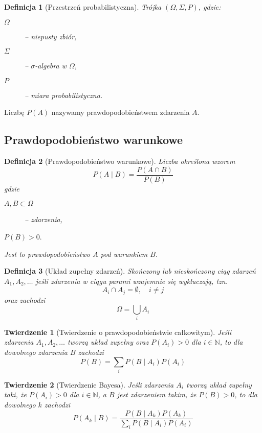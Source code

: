 \documentclass[11pt, leqno]{scrartcl}
\theoremstyle{mydefinition}
\newtheorem{definition}{Definicja}[subsection]
\theoremstyle{mytheorem}
\newtheorem{theorem}{Twierdzenie}[subsection]
\begin{document}
    \begin{definition}[Przestrzeń probabilistyczna]
        Trójka $(\Omega,\Sigma,P)$, gdzie:
        \begin{description}
            \item[$\Omega$] -- niepusty zbiór,
            \item[$\Sigma$] -- $\sigma$-algebra w $\Omega$,
            \item[$P$] -- miara probabilistyczna.
        \end{description}
    \end{definition}
    Liczbę $P(A)$ nazywamy prawdopodobieństwem zdarzenia $A$.

    \subsection{Prawdopodobieństwo warunkowe}
    \begin{definition}[Prawdopodobieństwo warunkowe]
        Liczba określona wzorem
        \[
            P(A \mid B)=\frac{P(A \cap B)}{P(B)}
        \]
        gdzie
        \begin{description}
            \item[$A,B \subset \Omega$] -- zdarzenia,
            \item[$P(B)>0$.]
        \end{description}
        Jest to prawdopodobieństwo $A$ pod warunkiem $B$.
    \end{definition}
    \begin{definition}[Układ zupełny zdarzeń]
        Skończony lub nieskończony ciąg zdarzeń $A_1,A_2,\ldots$ jeśli
        zdarzenia w ciągu parami wzajemnie się wykluczają, tzn.
        \[
            A_i \cap A_j =\emptyset, \quad i \neq j
        \]
        oraz zachodzi
        \[
            \Omega=\bigcup_{i}A_i
        \]
    \end{definition}
    \begin{theorem}[Twierdzenie o prawdopodobieństwie całkowitym]
        Jeśli zdarzenia $A_1,A_2,\ldots$ tworzą układ zupełny oraz
        $P(A_i)>0$ dla $i \in \mathbb{N}$, to dla dowolnego
        zdarzenia $B$ zachodzi
        \[
            P(B)=\sum_{i}P(B \mid A_i)P(A_i)
        \]
    \end{theorem}
    \begin{theorem}[Twierdzenie Bayesa]
        Jeśli zdarzenia $A_i$ tworzą układ zupełny taki, że
        $P(A_i)>0$ dla $i \in \mathbb{N}$, a $B$ jest zdarzeniem
        takim, że $P(B)>0$, to dla dowolnego $k$ zachodzi
        \[
            P(A_k \mid B)=\frac{P(B \mid A_k)P(A_k)}
            {\sum_{i}P(B \mid A_i)P(A_i)}
        \]
    \end{theorem}
    
\end{document}
